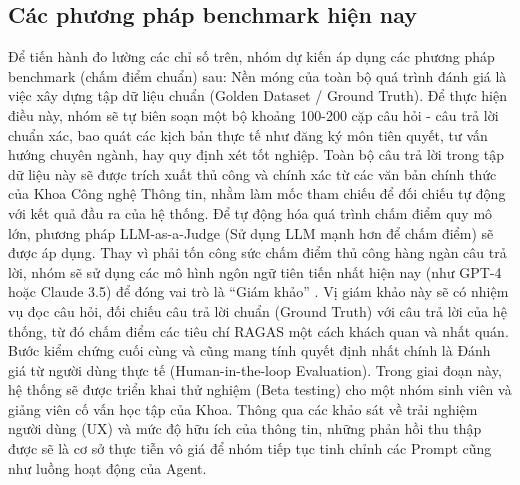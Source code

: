 \subsection{Các phương pháp benchmark hiện nay}
Để tiến hành đo lường các chỉ số trên, nhóm dự kiến áp dụng các phương pháp benchmark (chấm điểm chuẩn) sau:
Nền móng của toàn bộ quá trình đánh giá là việc xây dựng tập dữ liệu chuẩn (Golden Dataset / Ground Truth). Để thực hiện điều này, nhóm sẽ tự biên soạn một bộ khoảng 100-200 cặp câu hỏi - câu trả lời chuẩn xác, bao quát các kịch bản thực tế như đăng ký môn tiên quyết, tư vấn hướng chuyên ngành, hay quy định xét tốt nghiệp. Toàn bộ câu trả lời trong tập dữ liệu này sẽ được trích xuất thủ công và chính xác từ các văn bản chính thức của Khoa Công nghệ Thông tin, nhằm làm mốc tham chiếu để đối chiếu tự động với kết quả đầu ra của hệ thống.
Để tự động hóa quá trình chấm điểm quy mô lớn, phương pháp LLM-as-a-Judge (Sử dụng LLM mạnh hơn để chấm điểm) sẽ được áp dụng. Thay vì phải tốn công sức chấm điểm thủ công hàng ngàn câu trả lời, nhóm sẽ sử dụng các mô hình ngôn ngữ tiên tiến nhất hiện nay (như GPT-4 hoặc Claude 3.5) để đóng vai trò là ``Giám khảo'' \cite{zheng2023judging}. Vị giám khảo này sẽ có nhiệm vụ đọc câu hỏi, đối chiếu câu trả lời chuẩn (Ground Truth) với câu trả lời của hệ thống, từ đó chấm điểm các tiêu chí RAGAS một cách khách quan và nhất quán.
Bước kiểm chứng cuối cùng và cũng mang tính quyết định nhất chính là Đánh giá từ người dùng thực tế (Human-in-the-loop Evaluation). Trong giai đoạn này, hệ thống sẽ được triển khai thử nghiệm (Beta testing) cho một nhóm sinh viên và giảng viên cố vấn học tập của Khoa. Thông qua các khảo sát về trải nghiệm người dùng (UX) và mức độ hữu ích của thông tin, những phản hồi thu thập được sẽ là cơ sở thực tiễn vô giá để nhóm tiếp tục tinh chỉnh các Prompt cũng như luồng hoạt động của Agent.
